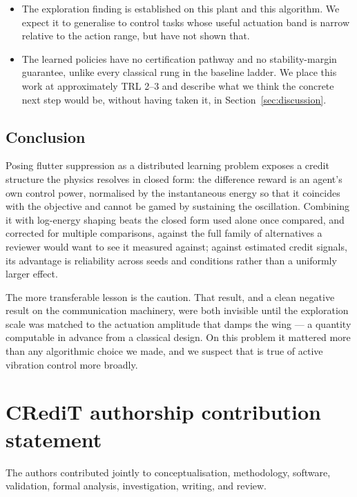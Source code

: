 \documentclass[preprint,11pt,authoryear]{elsarticle}
\begin{document}
\begin{itemize}
the same standard. Correcting for the number of pairwise comparisons made
across the five-variant credit family (Holm-Bonferroni) changed which
comparisons are significant, and bringing the exploration sweep to six seeds
changed our own estimate of its seed-to-seed spread substantially, though not
the qualitative shape of the curve; see Sections~\ref{sec:ablations}
and~\ref{sec:exploration} for what did and did not survive.
\item The exploration finding is established on this plant and this algorithm. We
expect it to generalise to control tasks whose useful actuation band is narrow
relative to the action range, but have not shown that.
\item The learned policies have no certification pathway and no
stability-margin guarantee, unlike every classical rung in the baseline
ladder. We place this work at approximately TRL 2--3 and describe what we
think the concrete next step would be, without having taken it, in
Section~\ref{sec:discussion}.
\end{itemize}

\subsection{Conclusion}

Posing flutter suppression as a distributed learning problem exposes a credit
structure the physics resolves in closed form: the difference reward is an
agent's own control power, normalised by the instantaneous energy so that it
coincides with the objective and cannot be gamed by sustaining the oscillation.
Combining it with log-energy shaping beats the closed form used alone once
compared, and corrected for multiple comparisons, against the full family of
alternatives a reviewer would want to see it measured against; against
estimated credit signals, its advantage is reliability across seeds and
conditions rather than a uniformly larger effect.

The more transferable lesson is the caution. That result, and a clean negative
result on the communication machinery, were both invisible until the exploration
scale was matched to the actuation amplitude that damps the wing --- a quantity
computable in advance from a classical design. On this problem it mattered more
than any algorithmic choice we made, and we suspect that is true of active
vibration control more broadly.

\section*{CRediT authorship contribution statement}
The authors contributed jointly to conceptualisation, methodology, software,
validation, formal analysis, investigation, writing, and review.
\end{document}
